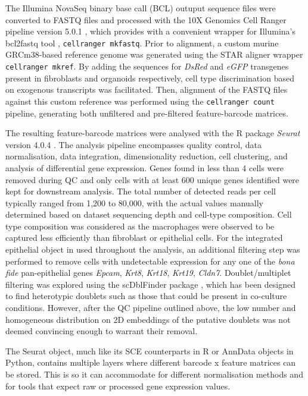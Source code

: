 The Illumina NovaSeq binary base call (BCL) outuput sequence files were converted to FASTQ files and processed with the 10X Genomics Cell Ranger pipeline version 5.0.1 \cite{10x_genomics_what_nodate}, which provides with a convenient wrapper for Illumina's bcl2fastq tool \cite{illumina_bcl2fastq_nodate}, \texttt{cellranger mkfastq}. Prior to alignment, a custom murine GRCm38-based reference genome was generated using the STAR aligner \cite{dobin_star_2013} wrapper \texttt{cellranger mkref}. By adding the sequences for \textit{DsRed} and \textit{eGFP} transgenes present in fibroblasts and organoids respectively, cell type discrimination based on exogenous transcripts was facilitated. Then, alignment of the FASTQ files against this custom reference was performed using the \texttt{cellranger count} pipeline, generating both unfiltered and pre-filtered feature-barcode matrices.

The resulting feature-barcode matrices were analysed with the R package \textit{Seurat} version 4.0.4 \cite{hao_integrated_2021}. 
The analysis pipeline encompasses quality control, data normalisation, data integration, dimensionality reduction, cell clustering, and analysis of differential gene expression. 
Genes found in less than 4 cells were removed during QC and only cells with at least 600 unique genes identified were kept for downstream analysis. The total number of detected reads per cell typically ranged from 1,200 to 80,000, with the actual values manually determined based on dataset sequencing depth and cell-type composition. 
Cell type composition was considered as the macrophages were observed to be captured less efficiently than fibroblast or epithelial cells.
For the integrated epithelial object in used throughout the analysis, an additional filtering step was performed to remove cells with undetectable expression for any one of the \emph{bona fide} pan-epithelial genes \textit{Epcam}, \textit{Krt8}, \textit{Krt18}, \textit{Krt19}, \textit{Cldn7}. 
Doublet/multiplet filtering was explored using the scDblFinder package \cite{germain_scdblfinder}, which has been designed to find heterotypic doublets such as those that could be present in co-culture conditions. However, after the QC pipeline outlined above, the low number and homogeneous distribution on 2D embeddings of the putative doublets was not deemed convincing enough to warrant their removal.

The Seurat object, much like its SCE counterparts in R or AnnData objects in Python, contains multiple layers where different barcode x feature matrices can be stored. This is so it can accommodate for different normalisation methods and for tools that expect raw or processed gene expression values. 

